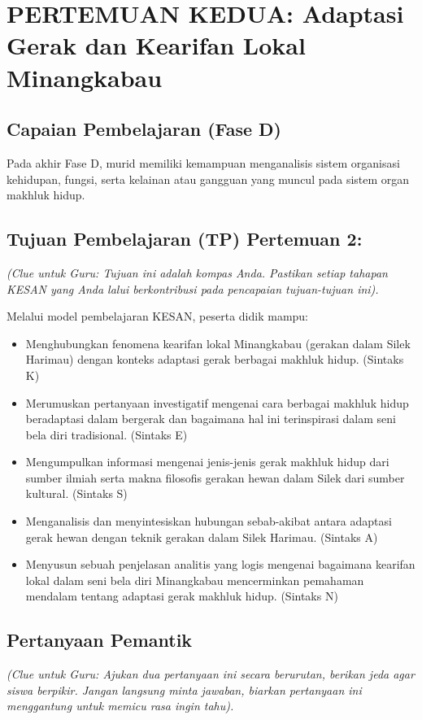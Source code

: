 \documentclass[a4paper,12pt]{article}
\begin{document}
\section{PERTEMUAN KEDUA: Adaptasi Gerak dan Kearifan Lokal Minangkabau}

\subsection{Capaian Pembelajaran (Fase D)}
Pada akhir Fase D, murid memiliki kemampuan menganalisis sistem organisasi kehidupan, fungsi, serta kelainan atau gangguan yang muncul pada sistem organ makhluk hidup.

\subsection{Tujuan Pembelajaran (TP) Pertemuan 2:}
\textit{(Clue untuk Guru: Tujuan ini adalah kompas Anda. Pastikan setiap tahapan KESAN yang Anda lalui berkontribusi pada pencapaian tujuan-tujuan ini).}

Melalui model pembelajaran KESAN, peserta didik mampu:
\begin{itemize}
\item Menghubungkan fenomena kearifan lokal Minangkabau (gerakan dalam Silek Harimau) dengan konteks adaptasi gerak berbagai makhluk hidup. (Sintaks K)
\item Merumuskan pertanyaan investigatif mengenai cara berbagai makhluk hidup beradaptasi dalam bergerak dan bagaimana hal ini terinspirasi dalam seni bela diri tradisional. (Sintaks E)
\item Mengumpulkan informasi mengenai jenis-jenis gerak makhluk hidup dari sumber ilmiah serta makna filosofis gerakan hewan dalam Silek dari sumber kultural. (Sintaks S)
\item Menganalisis dan menyintesiskan hubungan sebab-akibat antara adaptasi gerak hewan dengan teknik gerakan dalam Silek Harimau. (Sintaks A)
\item Menyusun sebuah penjelasan analitis yang logis mengenai bagaimana kearifan lokal dalam seni bela diri Minangkabau mencerminkan pemahaman mendalam tentang adaptasi gerak makhluk hidup. (Sintaks N)
\end{itemize}

\subsection{Pertanyaan Pemantik}
\textit{(Clue untuk Guru: Ajukan dua pertanyaan ini secara berurutan, berikan jeda agar siswa berpikir. Jangan langsung minta jawaban, biarkan pertanyaan ini menggantung untuk memicu rasa ingin tahu).}
\end{document}
